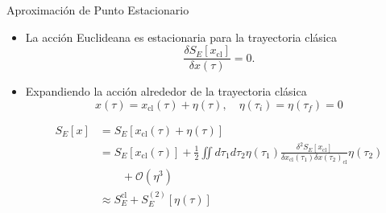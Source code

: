 \documentclass{beamer}
\theoremstyle{example}
\theoremstyle{example}
\begin{document}
\begin{frame}{Aproximación de Punto Estacionario}
\begin{itemize}
    \item La acción Euclideana es estacionaria para la trayectoria clásica
    \begin{equation}\label{eq:minimo}
        \frac{\delta S_E[x_{\textrm{cl}}]}{\delta x(\tau)} = 0.
    \end{equation}
    
    \item Expandiendo la acción alrededor de la trayectoria clásica
    \begin{equation} \label{eq:trayec}
        x(\tau) = x_{\textrm{cl}}(\tau) + \eta(\tau), \quad \eta(\tau_i) = \eta(\tau_f) = 0
    \end{equation}

    \begin{equation}
    \label{eq:Saprox}
    \begin{aligned} 
        S_{E}[x] &= S_{E}[x_{\textrm{cl}}(\tau) + \eta(\tau)] \\ 
            &= S_{E}[x_{\textrm{cl}}(\tau)] + \frac{1}{2} \iint  d\tau_1 d\tau_2  \eta(\tau_1) \frac{\delta^2 S_E[x_{\textrm{cl}}]}{\delta x_{\textrm{cl}}(\tau_1) \delta x(\tau_2)_{\textrm{cl}}} \eta(\tau_2) \\
            &\qquad + \mathcal{O}(\eta^3) \\ 
            &\approx S_E^{\textrm{cl}} + S_E^{(2)}[\eta(\tau)]
    \end{aligned}
    \end{equation}
\end{itemize}
\end{frame}
\end{document}
